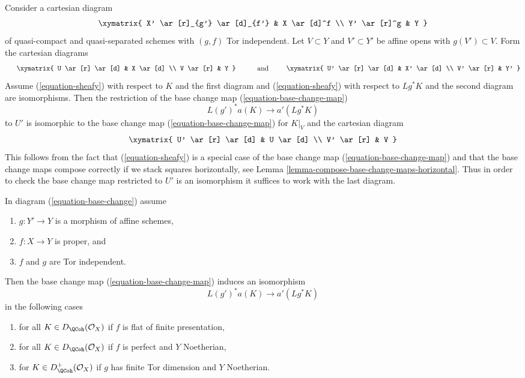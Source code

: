 \begin{remark}
\label{remark-check-over-affines}
Consider a cartesian diagram
$$
\xymatrix{
X' \ar[r]_{g'} \ar[d]_{f'} & X \ar[d]^f \\
Y' \ar[r]^g & Y
}
$$
of quasi-compact and quasi-separated schemes with $(g, f)$ Tor independent.
Let $V \subset Y$ and $V' \subset Y'$ be affine opens with
$g(V') \subset V$. Form the cartesian diagrams
$$
\vcenter{
\xymatrix{
U \ar[r] \ar[d] & X \ar[d] \\
V \ar[r] & Y
}
}
\quad\text{and}\quad
\vcenter{
\xymatrix{
U' \ar[r] \ar[d] & X' \ar[d] \\
V' \ar[r] & Y'
}
}
$$
Assume (\ref{equation-sheafy}) with respect to $K$
and the first diagram and (\ref{equation-sheafy})
with respect to $Lg^*K$ and the second diagram are isomorphisms.
Then the restriction of the base change map (\ref{equation-base-change-map})
$$
L(g')^*a(K) \longrightarrow a'(Lg^*K)
$$
to $U'$ is isomorphic to the base change map
(\ref{equation-base-change-map}) for $K|_V$ and the
cartesian diagram
$$
\xymatrix{
U' \ar[r] \ar[d] & U \ar[d] \\
V' \ar[r] & V
}
$$
This follows from the fact that (\ref{equation-sheafy})
is a special case of the base change map (\ref{equation-base-change-map})
and that the base change maps compose correctly if we stack squares
horizontally, see Lemma \ref{lemma-compose-base-change-maps-horizontal}.
Thus in order to check the base change map restricted to $U'$
is an isomorphism it suffices to work with the last diagram.
\end{remark}

\begin{lemma}
\label{lemma-more-base-change}
In diagram (\ref{equation-base-change}) assume
\begin{enumerate}
\item $g : Y' \to Y$ is a morphism of affine schemes,
\item $f : X \to Y$ is proper, and
\item $f$ and $g$ are Tor independent.
\end{enumerate}
Then the base change map (\ref{equation-base-change-map}) induces an
isomorphism
$$
L(g')^*a(K) \longrightarrow a'(Lg^*K)
$$
in the following cases
\begin{enumerate}
\item for all $K \in D_\QCoh(\mathcal{O}_X)$ if $f$
is flat of finite presentation,
\item for all $K \in D_\QCoh(\mathcal{O}_X)$ if $f$
is perfect and $Y$ Noetherian,
\item for $K \in D_\QCoh^+(\mathcal{O}_X)$ if $g$ has finite Tor dimension
and $Y$ Noetherian.
\end{enumerate}
\end{lemma}

